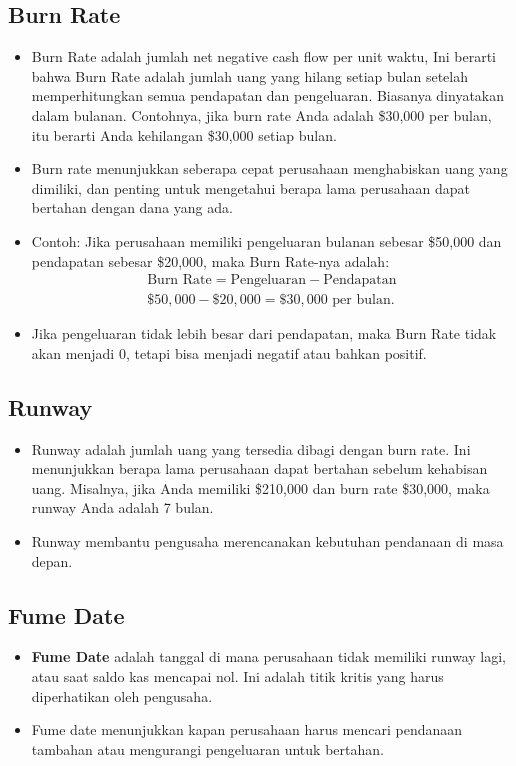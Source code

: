 \documentclass{article}
\begin{document}
\subsection{Burn Rate}
\begin{itemize}
    \item Burn Rate adalah jumlah net negative cash flow per unit waktu, Ini berarti bahwa Burn Rate adalah jumlah uang yang hilang setiap bulan setelah memperhitungkan semua pendapatan dan pengeluaran. Biasanya dinyatakan dalam bulanan. Contohnya, jika burn rate Anda adalah \$30,000 per bulan, itu berarti Anda kehilangan \$30,000 setiap bulan.
    \item Burn rate menunjukkan seberapa cepat perusahaan menghabiskan uang yang dimiliki, dan penting untuk mengetahui berapa lama perusahaan dapat bertahan dengan dana yang ada.
    \item Contoh: Jika perusahaan memiliki pengeluaran bulanan sebesar \$50,000 dan pendapatan sebesar \$20,000, maka Burn Rate-nya adalah:
          \begin{align*}
              \text{Burn Rate} = \text{Pengeluaran} - \text{Pendapatan} \\
              \$50,000 - \$20,000 = \$30,000 \text{ per bulan}.
          \end{align*}
    \item Jika pengeluaran tidak lebih besar dari pendapatan, maka Burn Rate tidak akan menjadi 0, tetapi bisa menjadi negatif atau bahkan positif.
\end{itemize}

\subsection{Runway}
\begin{itemize}
    \item Runway adalah jumlah uang yang tersedia dibagi dengan burn rate. Ini menunjukkan berapa lama perusahaan dapat bertahan sebelum kehabisan uang. Misalnya, jika Anda memiliki \$210,000 dan burn rate \$30,000, maka runway Anda adalah 7 bulan.
    \item Runway membantu pengusaha merencanakan kebutuhan pendanaan di masa depan.
\end{itemize}

\subsection{Fume Date}
\begin{itemize}
    \item \textbf{Fume Date} adalah tanggal di mana perusahaan tidak memiliki runway lagi, atau saat saldo kas mencapai nol. Ini adalah titik kritis yang harus diperhatikan oleh pengusaha.
    \item Fume date menunjukkan kapan perusahaan harus mencari pendanaan tambahan atau mengurangi pengeluaran untuk bertahan.
\end{itemize}
\end{document}
